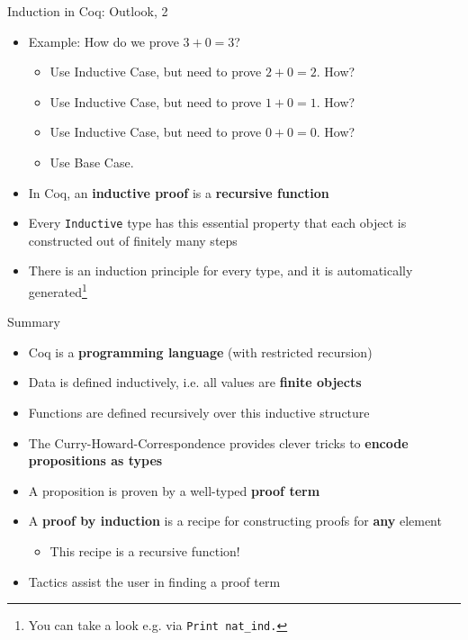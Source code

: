 \begin{frame}[fragile]{Induction in Coq: Outlook, 2}
\begin{itemize}
  \item Example: How do we prove $3 + 0 = 3$?
    \begin{itemize}
      \item Use Inductive Case, but need to prove $2 + 0 = 2$. How?
      \item Use Inductive Case, but need to prove $1 + 0 = 1$. How?
      \item Use Inductive Case, but need to prove $0 + 0 = 0$. How?
      \item Use Base Case.
    \end{itemize}
  \pause
  \item In Coq, an \textbf{inductive proof} is a \textbf{recursive function}
  \pause
  \item Every \lstinline|Inductive| type has this essential property that each object is constructed out of finitely many steps
  \pause
  \item There is an induction principle for every type, and it is automatically generated\footnote{You can take a look e.g. via \lstinline|Print nat_ind.|}
\end{itemize}
\end{frame}

\begin{frame}[fragile]{Summary}
  \begin{itemize}
    \item Coq is a \textbf{programming language} (with restricted recursion)
    \pause
    \item Data is defined inductively, i.e. all values are \textbf{finite objects}
    \pause
    \item Functions are defined recursively over this inductive structure
    \pause
    \item The Curry-Howard-Correspondence provides clever tricks to \textbf{encode propositions as types}
    \pause
    \item A proposition is proven by a well-typed \textbf{proof term}
    \pause
    \item A \textbf{proof by induction} is a recipe for constructing proofs for \textbf{any} element
      \begin{itemize}
        \item This recipe is a recursive function!
      \end{itemize}
    \pause
    \item Tactics assist the user in finding a proof term
  \end{itemize}
\end{frame}


